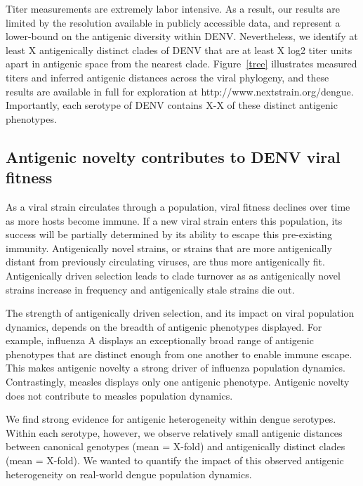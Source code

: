 \documentclass[11pt,oneside,letterpaper]{article}
\begin{document}
Titer measurements are extremely labor intensive.
As a result, our results are limited by the resolution available in publicly accessible data, and represent a lower-bound on the antigenic diversity within DENV.
Nevertheless, we identify at least X antigenically distinct clades of DENV that are at least X log2 titer units apart in antigenic space from the nearest clade.
Figure~\ref{tree} illustrates measured titers and inferred antigenic distances across the viral phylogeny, and these results are available in full for exploration at http://www.nextstrain.org/dengue.
Importantly, each serotype of DENV contains X-X of these distinct antigenic phenotypes.

\subsection*{Antigenic novelty contributes to DENV viral fitness}

As a viral strain circulates through a population, viral fitness declines over time as more hosts become immune.
If a new viral strain enters this population, its success will be partially determined by its ability to escape this pre-existing immunity.
Antigenically novel strains, or strains that are more antigenically distant from previously circulating viruses, are thus more antigenically fit.
Antigenically driven selection leads to clade turnover as as antigenically novel strains increase in frequency and antigenically stale strains die out.

The strength of antigenically driven selection, and its impact on viral population dynamics, depends on the breadth of antigenic phenotypes displayed.
For example, influenza A displays an exceptionally broad range of antigenic phenotypes that are distinct enough from one another to enable immune escape.
This makes antigenic novelty a strong driver of influenza population dynamics.
Contrastingly, measles displays only one antigenic phenotype.
Antigenic novelty does not contribute to measles population dynamics.

We find strong evidence for antigenic heterogeneity within dengue serotypes.
Within each serotype, however, we observe relatively small antigenic distances between canonical genotypes (mean = X-fold) and antigenically distinct clades (mean = X-fold).
We wanted to quantify the impact of this observed antigenic heterogeneity on real-world dengue population dynamics.
\end{document}
